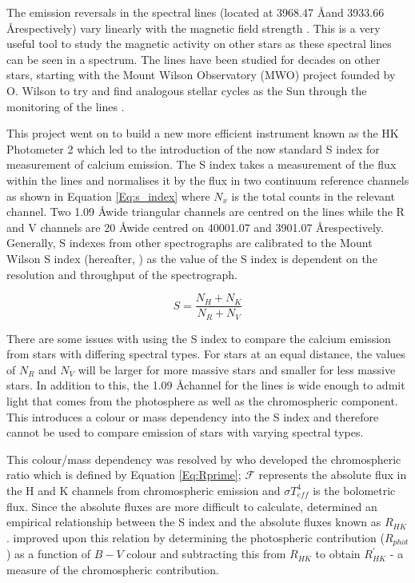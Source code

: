 The emission reversals in the \caII spectral lines (located at 3968.47 \AA \space and 3933.66 \AA \space respectively) vary linearly with the magnetic field strength \citep{Frazier_1970}. This is a very useful tool to study the magnetic activity on other stars as these spectral lines can be seen in a spectrum. The \caII lines have been studied for decades on other stars, starting with the Mount Wilson Observatory (MWO) project founded by O. Wilson to try and find analogous stellar cycles as the Sun through the monitoring of the \caII lines \citep{Wilson_1968}.

This project went on to build a new more efficient instrument known as the HK Photometer 2 \citep{Vaughan_etal_1978} which led to the introduction of the now standard S index for measurement of calcium emission. The S index takes a measurement of the flux within the \caII lines and normalises it by the flux in two continuum reference channels as shown in Equation \ref{Eq:s_index} where $N_{x}$ is the total counts in the relevant channel. Two 1.09 \AA \space wide triangular channels are centred on the \caII lines while the R and V channels are 20 \AA \space wide centred on 40001.07 and 3901.07 \AA \space respectively. Generally, S indexes from other spectrographs are calibrated to the Mount Wilson S index (hereafter, \Smw) as the value of the S index is dependent on the resolution and throughput of the spectrograph.

\begin{equation}
    S = \frac{N_{H} + N_{K}}{N_{R} + N_{V}}
    \label{Eq:s_index}
\end{equation}

There are some issues with using the S index to compare the calcium emission from stars with differing spectral types. For stars at an equal distance, the values of $N_{R}$ and $N_{V}$ will be larger for more massive stars and smaller for less massive stars. In addition to this, the 1.09 \AA \space channel for the \caII lines is wide enough to admit light that comes from the photosphere as well as the chromospheric component. This introduces a colour or mass dependency into the S index and therefore cannot be used to compare emission of stars with varying spectral types.

This colour/mass dependency was resolved by \citet{Noyes_etal_1984} who developed the chromospheric ratio \Rprime which is defined by Equation \ref{Eq:Rprime}; $\mathcal{F}$ represents the absolute flux in the H and K channels from chromospheric emission and $\sigma T_{eff}^{4}$ is the bolometric flux. Since the absolute fluxes are more difficult to calculate, \citet{Middelkoop_1982} determined an empirical relationship between the S index and the absolute fluxes known as $R_{HK}$. \citet{Noyes_etal_1984} improved upon this relation by determining the photospheric contribution ($R_{phot}$) as a function of $B-V$ colour and subtracting this from $R_{HK}$ to obtain $R^{'}_{HK}$ - a measure of the chromospheric contribution.

